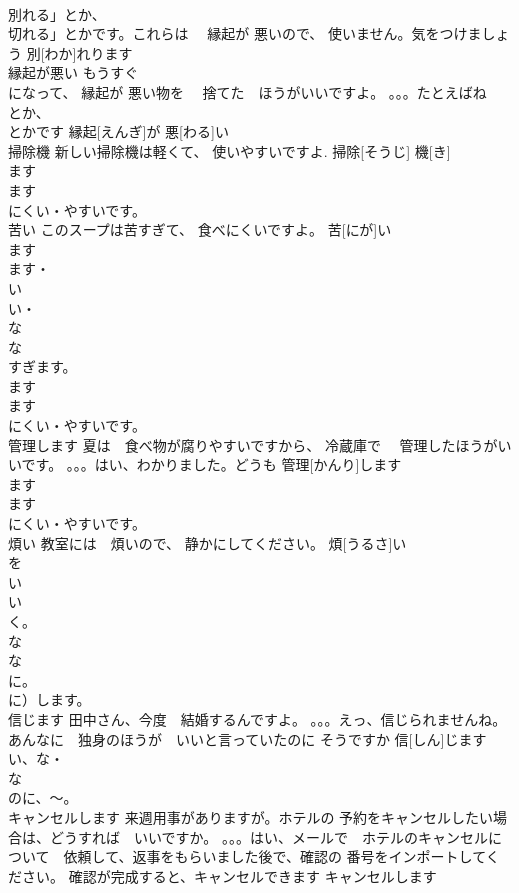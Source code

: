 \documentclass[8pt]{extreport}
\begin{document}
\begin{CJK}{UTF8}{min}
\\	別れる」とか、
\\	切れる」とかです。これらは　 縁起が 悪いので、 使いません。気をつけましょう	別[わか]れります					
\\	縁起が悪い	もうすぐ 
\\	になって、 縁起が 悪い物を　 捨てた　ほうがいいですよ。 。。。たとえばね　
\\	とか、
\\	とかです	縁起[えんぎ]が 悪[わる]い					
\\	掃除機	新しい掃除機は軽くて、 使いやすいですよ.	掃除[そうじ] 機[き]				
\\	ます　
\\	ます
\\	にくい・やすいです。
\\	苦い	このスープは苦すぎて、 食べにくいですよ。	苦[にが]い				
\\	ます　
\\	ます・
\\	い
\\	い・
\\	な
\\	な
\\	すぎます。
\\	ます　
\\	ます
\\	にくい・やすいです。
\\	管理します	夏は　食べ物が腐りやすいですから、 冷蔵庫で　 管理したほうがいいです。 。。。はい、わかりました。どうも	管理[かんり]します			
\\	ます　
\\	ます
\\	にくい・やすいです。
\\	煩い	教室には　煩いので、 静かにしてください。	煩[うるさ]い				
\\	を
\\	い
\\	い
\\	く。
\\	な
\\	な
\\	に。
\\	に）します。
\\	信じます	田中さん、今度　結婚するんですよ。 。。。えっ、信じられませんね。あんなに　独身のほうが　いいと言っていたのに そうですか	信[しん]じます				
\\	い、な・
\\	な
\\	のに、～。
\\	キャンセルします	来週用事がありますが。ホテルの 予約をキャンセルしたい場合は、どうすれば　いいですか。 。。。はい、メールで　ホテルのキャンセルについて　依頼して、返事をもらいました後で、確認の 番号をインポートしてください。 確認が完成すると、キャンセルできます	キャンセルします			

\end{CJK}
\end{document}
